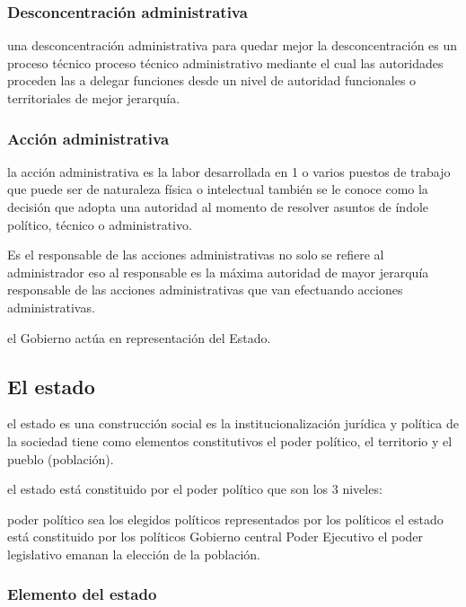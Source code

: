 \documentclass[
  a4paper,
]{article}
\begin{document}
\subsubsection{Desconcentración
administrativa}\label{desconcentraciuxf3n-administrativa}

una desconcentración administrativa para quedar mejor la
desconcentración es un proceso técnico proceso técnico administrativo
mediante el cual las autoridades proceden las a delegar funciones desde
un nivel de autoridad funcionales o territoriales de mejor jerarquía.

\subsubsection{Acción administrativa}\label{acciuxf3n-administrativa}

la acción administrativa es la labor desarrollada en 1 o varios puestos
de trabajo que puede ser de naturaleza física o intelectual también se
le conoce como la decisión que adopta una autoridad al momento de
resolver asuntos de índole político, técnico o administrativo.

Es el responsable de las acciones administrativas no solo se refiere al
administrador eso al responsable es la máxima autoridad de mayor
jerarquía responsable de las acciones administrativas que van efectuando
acciones administrativas.

el Gobierno actúa en representación del Estado.

\subsection{El estado}\label{el-estado}

el estado es una construcción social es la institucionalización jurídica
y política de la sociedad tiene como elementos constitutivos el poder
político, el territorio y el pueblo (población).

el estado está constituido por el poder político que son los 3 niveles:

poder político sea los elegidos políticos representados por los
políticos el estado está constituido por los políticos Gobierno central
Poder Ejecutivo el poder legislativo emanan la elección de la población.

\subsubsection{Elemento del estado}\label{elemento-del-estado}
\end{document}
